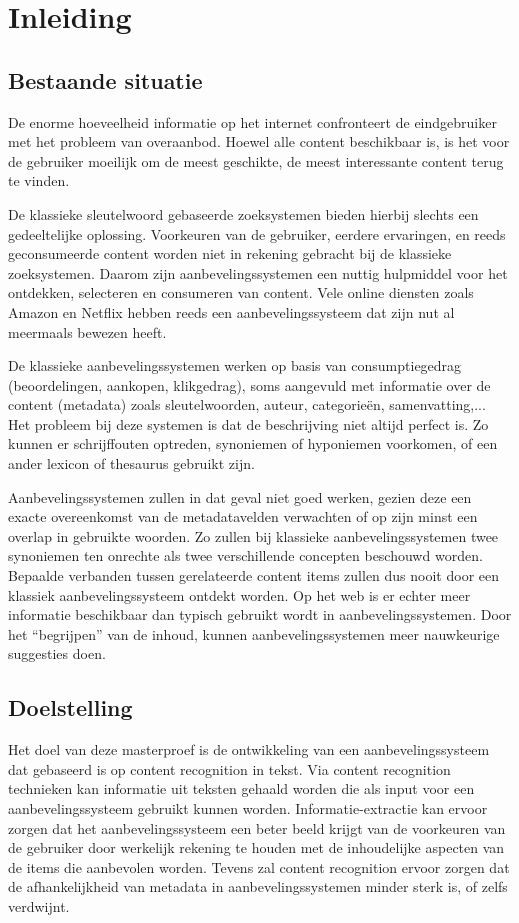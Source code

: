 \chapter{Inleiding}

\section{Bestaande situatie}
De enorme hoeveelheid informatie op het internet confronteert de eindgebruiker met het probleem van overaanbod.
Hoewel alle content beschikbaar is, is het voor de gebruiker moeilijk om de meest geschikte, de meest interessante content terug te vinden. 

De klassieke sleutelwoord gebaseerde zoeksystemen bieden hierbij slechts een gedeeltelijke
oplossing. Voorkeuren van de gebruiker, eerdere ervaringen, en reeds geconsumeerde content worden niet in
rekening gebracht bij de klassieke zoeksystemen. Daarom zijn aanbevelingssystemen een nuttig hulpmiddel voor het
ontdekken, selecteren en consumeren van content. Vele online diensten zoals Amazon \cite{Everything2012} en Netflix \cite{Bennett2007} hebben
reeds een aanbevelingssysteem dat zijn nut al meermaals bewezen heeft. 

De klassieke aanbevelingssystemen werken op basis van consumptiegedrag (beoordelingen, aankopen, klikgedrag),
soms aangevuld met informatie over de content (metadata) zoals sleutelwoorden, auteur, categorie\"en, samenvatting,... Het probleem bij deze systemen is dat de beschrijving niet altijd perfect is. Zo kunnen er schrijffouten optreden, synoniemen of hyponiemen voorkomen, of een ander lexicon of thesaurus gebruikt zijn.

Aanbevelingssystemen zullen in dat geval niet goed werken, gezien deze een exacte overeenkomst van de metadatavelden verwachten of op zijn minst een overlap in gebruikte woorden. Zo zullen bij klassieke aanbevelingssystemen
twee synoniemen ten onrechte als twee verschillende concepten beschouwd worden. Bepaalde verbanden tussen
gerelateerde content items zullen dus nooit door een klassiek aanbevelingssysteem ontdekt worden.
Op het web is er echter meer informatie beschikbaar dan typisch gebruikt wordt in aanbevelingssystemen. Door het “begrijpen” van de inhoud, kunnen aanbevelingssystemen meer nauwkeurige suggesties doen.

\section{Doelstelling}
Het doel van deze masterproef is de ontwikkeling van een aanbevelingssysteem dat gebaseerd is op content recognition in tekst. Via content recognition technieken kan informatie uit teksten gehaald worden die als input voor een aanbevelingssysteem gebruikt kunnen worden. Informatie-extractie kan ervoor zorgen dat het aanbevelingssysteem een beter beeld krijgt van de voorkeuren van de gebruiker door werkelijk rekening te houden met de inhoudelijke aspecten van de items die aanbevolen worden. Tevens zal content recognition ervoor zorgen dat de afhankelijkheid van metadata in aanbevelingssystemen minder sterk is, of zelfs verdwijnt.

